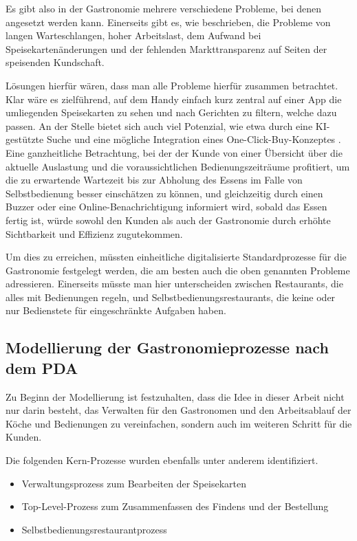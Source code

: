 Es gibt also in der Gastronomie mehrere verschiedene Probleme, bei denen angesetzt werden kann. Einerseits gibt es, wie beschrieben, die Probleme von langen Warteschlangen, hoher Arbeitslast, dem Aufwand bei Speisekartenänderungen und der fehlenden Markttransparenz auf Seiten der speisenden Kundschaft.

Lösungen hierfür wären, dass man alle Probleme hierfür zusammen betrachtet. Klar wäre es zielführend, auf dem Handy einfach kurz zentral auf einer App die umliegenden Speisekarten zu sehen und nach Gerichten zu filtern, welche dazu passen. An der Stelle bietet sich auch viel Potenzial, wie etwa durch eine KI-gestützte Suche und eine mögliche Integration eines One-Click-Buy-Konzeptes \citep[vgl.][]{amazon_oneclick_2025}. Eine ganzheitliche Betrachtung, bei der der Kunde von einer Übersicht über die aktuelle Auslastung und die voraussichtlichen Bedienungszeiträume profitiert, um die zu erwartende Wartezeit bis zur Abholung des Essens im Falle von Selbstbedienung besser einschätzen zu können, und gleichzeitig durch einen Buzzer oder eine Online-Benachrichtigung informiert wird, sobald das Essen fertig ist, würde sowohl den Kunden als auch der Gastronomie durch erhöhte Sichtbarkeit und Effizienz zugutekommen.

Um dies zu erreichen, müssten einheitliche digitalisierte Standardprozesse für die Gastronomie festgelegt werden, die am besten auch die oben genannten Probleme adressieren. Einerseits müsste man hier unterscheiden zwischen Restaurants, die alles mit Bedienungen regeln, und Selbstbedienungsrestaurants, die keine oder nur Bedienstete für eingeschränkte Aufgaben haben.

\clearpage
\subsection{Modellierung der Gastronomieprozesse nach dem \acl{PDA}}
\label{sec:modellierung}
Zu Beginn der Modellierung ist festzuhalten, dass die Idee in dieser Arbeit nicht nur darin besteht, das Verwalten für den Gastronomen und den Arbeitsablauf der Köche und Bedienungen zu vereinfachen, sondern auch im weiteren Schritt für die Kunden.

Die folgenden Kern-Prozesse wurden ebenfalls unter anderem identifiziert. 

\begin{itemize}
    \item Verwaltungsprozess zum Bearbeiten der Speisekarten
    \item Top-Level-Prozess zum Zusammenfassen des Findens und der Bestellung 
    \item Selbstbedienungsrestaurantprozess
\end{itemize}

